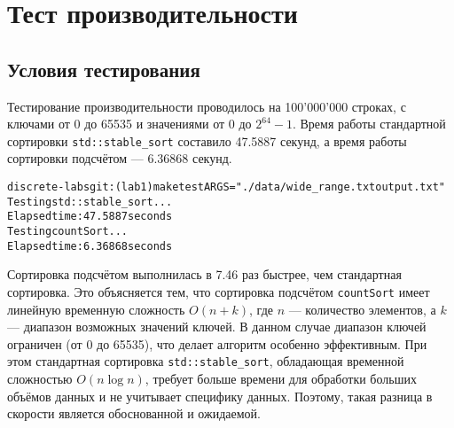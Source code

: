 \section{Тест производительности}

\subsection{Условия тестирования}

Тестирование производительности проводилось на 100'000'000 строках, с ключами от 0 до 65535 и значениями от 0 до $2^{64} - 1$.
Время работы стандартной сортировки \texttt{std::stable\_sort} составило 47.5887 секунд, а время работы сортировки подсчётом --- 6.36868 секунд.
\begin{alltt}
discrete-labs git:(lab1) make test ARGS="./data/wide_range.txt output.txt"
Testing std::stable_sort...
Elapsed time: 47.5887 seconds
Testing countSort...
Elapsed time: 6.36868 seconds
\end{alltt}

Сортировка подсчётом выполнилась в 7.46 раз быстрее, чем стандартная сортировка. Это объясняется тем, что сортировка подсчётом \texttt{countSort} имеет линейную временную сложность $O(n + k)$, где $n$ — количество элементов, а $k$ — диапазон возможных значений ключей. В данном случае диапазон ключей ограничен (от 0 до 65535), что делает алгоритм особенно эффективным. При этом стандартная сортировка \texttt{std::stable\_sort}, обладающая временной сложностью $O(n \log n)$, требует больше времени для обработки больших объёмов данных и не учитывает специфику данных. Поэтому, такая разница в скорости является обоснованной и ожидаемой.

\pagebreak

